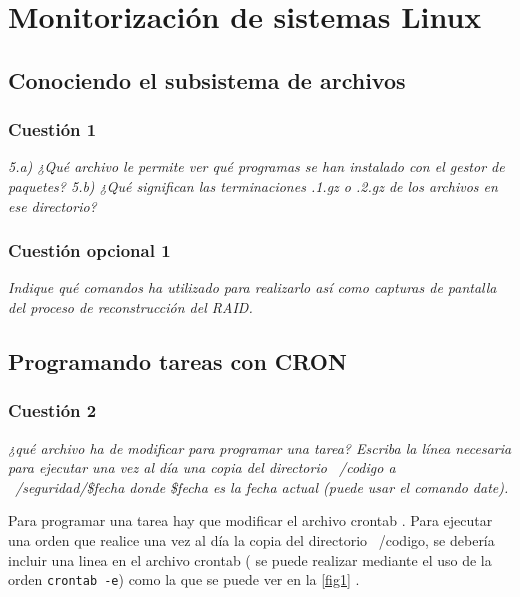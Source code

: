 



\maketitle %
\newpage %
\tableofcontents %
\listoffigures
\newpage

\section{Monitorización de sistemas Linux}
\subsection{Conociendo el subsistema de archivos}


\subsubsection{Cuestión 1}
\textit{5.a) ¿Qué archivo le permite ver qué programas se han instalado con el gestor de paquetes? 5.b) ¿Qué significan las terminaciones .1.gz o .2.gz de los archivos en ese directorio?}
\subsubsection{Cuestión opcional 1}
\textit{Indique qué comandos ha utilizado para realizarlo así como capturas de pantalla del proceso de reconstrucción del RAID.}
\subsection{Programando tareas con CRON}


\subsubsection{Cuestión 2}
\textit{¿qué archivo ha de modificar para programar una tarea? Escriba la línea necesaria para ejecutar una vez al día una copia del directorio ~/codigo a ~/seguridad/\$fecha donde \$fecha es la fecha actual (puede usar el comando date).}
\newline

Para programar una tarea hay que modificar el archivo crontab \cite{cron} \cite{cron2}. Para ejecutar una orden que realice una vez al día la copia del directorio ~/codigo, se debería incluir una linea en el archivo crontab ( se puede realizar mediante el uso de la orden \texttt{crontab -e}) como la que se puede ver en la  \cref{fig1} \cite{date}.

